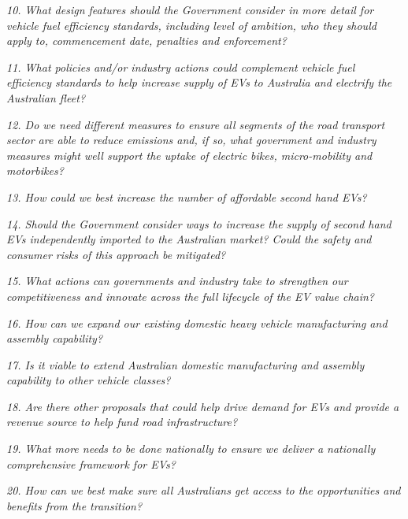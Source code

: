 \documentclass[12pt, draft]{article} \usepackage[shortlabels]{enumitem}
\begin{document}
\emph{10. What design features should the Government consider in more detail for vehicle fuel efficiency standards, including level of ambition, who they should
apply to, commencement date, penalties and enforcement?}

\emph{11. What policies and/or industry actions could complement vehicle fuel
efficiency standards to help increase supply of EVs to Australia and electrify
the Australian fleet?}

\emph{12. Do we need different measures to ensure all segments of the road transport
sector are able to reduce emissions and, if so, what government and industry
measures might well support the uptake of electric bikes, micro-mobility and
motorbikes?}

\emph{13. How could we best increase the number of affordable second hand EVs?}

\emph{14. Should the Government consider ways to increase the supply of second hand EVs independently imported to the Australian market? Could the safety and
consumer risks of this approach be mitigated?}

\emph{15. What actions can governments and industry take to strengthen our
competitiveness and innovate across the full lifecycle of the EV value chain?}

\emph{16. How can we expand our existing domestic heavy vehicle manufacturing and
assembly capability?}

\emph{17. Is it viable to extend Australian domestic manufacturing and assembly
capability to other vehicle classes?}

\emph{18. Are there other proposals that could help drive demand for EVs and provide
a revenue source to help fund road infrastructure?}

\emph{19. What more needs to be done nationally to ensure we deliver a nationally
comprehensive framework for EVs?}

\emph{20. How can we best make sure all Australians get access to the opportunities
and benefits from the transition?}
\end{document}
